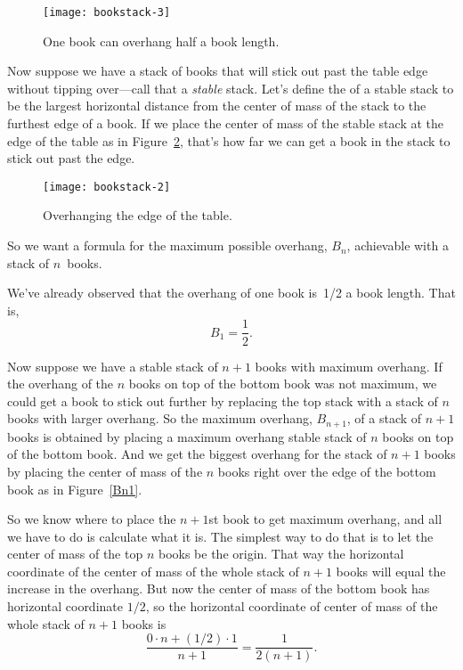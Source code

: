\begin{figure}[htbp]
\centerline{\texttt{[image: bookstack-3]}}
\caption{One book can overhang half a book length.}
\label{one-stable-book}
\end{figure}

Now suppose we have a stack of books that will stick out past the table
edge without tipping over---call that a \emph{stable} stack.  Let's define
the  of a stable stack to be the largest horizontal
distance from the center of mass of the stack to the furthest edge of a
book.  If we place the center of mass of the stable stack at the edge of
the table as in Figure~\ref{overhang}, that's how far we can get a book in
the stack to stick out past the edge.

\begin{figure}
\centerline{\texttt{[image: bookstack-2]}}
\caption{Overhanging the edge of the table.}
\label{overhang}
\end{figure}

So we want a formula for the maximum possible overhang, $B_n$, achievable
with a stack of $n$~books.

We've already observed that the overhang of one book is~1/2 a book
length.  That is,
\[
    B_1 = \frac{1}{2}.
\]

Now suppose we have a stable stack of $n+1$ books with maximum overhang.
If the overhang of the $n$ books on top of the bottom book was not
maximum, we could get a book to stick out further by replacing the top
stack with a stack of $n$ books with larger overhang.  So the maximum
overhang, $B_{n+1}$, of a stack of $n+1$ books is obtained by placing a
maximum overhang stable stack of $n$ books on top of the bottom book.  And
we get the biggest overhang for the stack of $n+1$ books by placing the
center of mass of the $n$ books right over the edge of the bottom book as
in Figure~\ref{Bn1}.

So we know where to place the $n+1$st book to get maximum overhang, and
all we have to do is calculate what it is.  The simplest way to do that is
to let the center of mass of the top $n$ books be the origin.  That way
the horizontal coordinate of the center of mass of the whole stack of
$n+1$ books will equal the increase in the overhang.  But now the
center of mass of the bottom book has horizontal coordinate $1/2$, so the
horizontal coordinate of center of mass of the whole stack of $n+1$ books is
\[
\frac{0 \cdot n + (1/2) \cdot 1}{n+1} = \frac{1}{2(n +1)}.
\]

